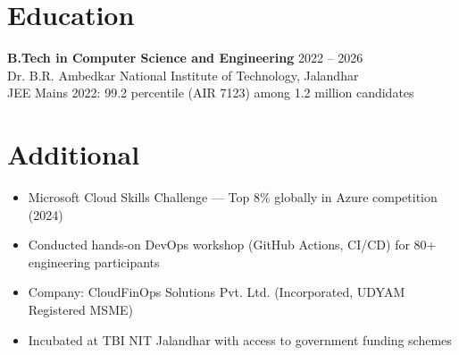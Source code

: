 \documentclass[a4paper,10pt]{article}
\begin{document}
\section{Education}
\textbf{B.Tech in Computer Science and Engineering} \hfill 2022 -- 2026 \\
Dr. B.R. Ambedkar National Institute of Technology, Jalandhar \\[2pt]
{\small JEE Mains 2022: 99.2 percentile (AIR 7123) among 1.2 million candidates}

\section{Additional}
\begin{itemize}
    \item Microsoft Cloud Skills Challenge — Top 8\% globally in Azure competition (2024)
    \item Conducted hands-on DevOps workshop (GitHub Actions, CI/CD) for 80+ engineering participants
    \item Company: CloudFinOps Solutions Pvt. Ltd. (Incorporated, UDYAM Registered MSME)
    \item Incubated at TBI NIT Jalandhar with access to government funding schemes
\end{itemize}
\end{document}
